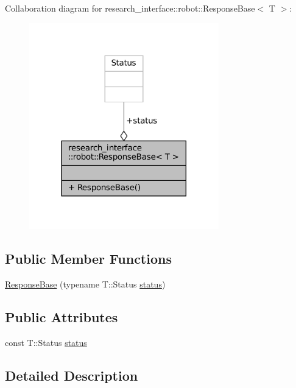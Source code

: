 Collaboration diagram for research\+\_\+interface\+:\+:robot\+:\+:Response\+Base$<$ T $>$\+:
\nopagebreak
\begin{figure}[H]
\begin{center}
\leavevmode
\includegraphics[width=233pt]{structresearch__interface_1_1robot_1_1ResponseBase__coll__graph}
\end{center}
\end{figure}
\subsection*{Public Member Functions}
\begin{DoxyCompactItemize}
\item 
\hyperlink{structresearch__interface_1_1robot_1_1ResponseBase_a10b3259c2dfd5ed4c4297e5993245fff}{Response\+Base} (typename T\+::\+Status \hyperlink{structresearch__interface_1_1robot_1_1ResponseBase_a99bb821172a0ac77338cd8e0acbe8a96}{status})
\end{DoxyCompactItemize}
\subsection*{Public Attributes}
\begin{DoxyCompactItemize}
\item 
const T\+::\+Status \hyperlink{structresearch__interface_1_1robot_1_1ResponseBase_a99bb821172a0ac77338cd8e0acbe8a96}{status}
\end{DoxyCompactItemize}


\subsection{Detailed Description}
